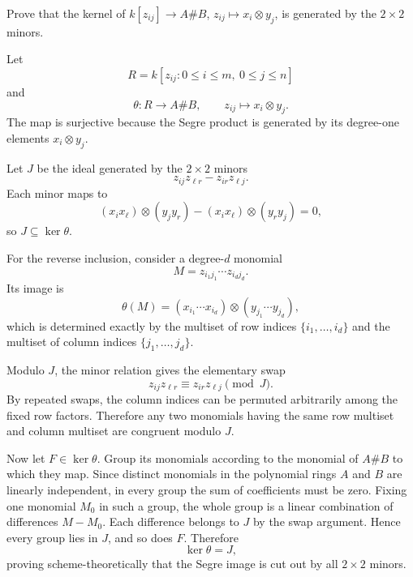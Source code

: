 \begin{problem}\label{prob:vi38-09}
Prove that the kernel of \(k[z_{ij}]\to A\#B\), \(z_{ij}\mapsto x_i\otimes y_j\), is generated by the \(2\times2\) minors.
\end{problem}

\ifdefined\FullProblemDossiers
\begin{solution}
Let
\[
R=k[z_{ij}:0\le i\le m,\ 0\le j\le n]
\]
and
\[
\theta:R\longrightarrow A\#B,
\qquad z_{ij}\longmapsto x_i\otimes y_j.
\]
The map is surjective because the Segre product is generated by its degree-one
elements \(x_i\otimes y_j\).

Let \(J\) be the ideal generated by the \(2\times2\) minors
\[
z_{ij}z_{\ell r}-z_{ir}z_{\ell j}.
\]
Each minor maps to
\[
(x_ix_\ell)\otimes(y_jy_r)-(x_ix_\ell)\otimes(y_ry_j)=0,
\]
so \(J\subseteq\ker\theta\).

For the reverse inclusion, consider a degree-\(d\) monomial
\[
M=z_{i_1j_1}\cdots z_{i_dj_d}.
\]
Its image is
\[
\theta(M)
=(x_{i_1}\cdots x_{i_d})\otimes(y_{j_1}\cdots y_{j_d}),
\]
which is determined exactly by the multiset of row indices
\(\{i_1,\ldots,i_d\}\) and the multiset of column indices
\(\{j_1,\ldots,j_d\}\).

Modulo \(J\), the minor relation gives the elementary swap
\[
z_{ij}z_{\ell r}\equiv z_{ir}z_{\ell j}\pmod J.
\]
By repeated swaps, the column indices can be permuted arbitrarily among the fixed
row factors. Therefore any two monomials having the same row multiset and column
multiset are congruent modulo \(J\).

Now let \(F\in\ker\theta\). Group its monomials according to the monomial of
\(A\#B\) to which they map. Since distinct monomials in the polynomial rings
\(A\) and \(B\) are linearly independent, in every group the sum of coefficients
must be zero. Fixing one monomial \(M_0\) in such a group, the whole group is a
linear combination of differences \(M-M_0\). Each difference belongs to \(J\) by
the swap argument. Hence every group lies in \(J\), and so does \(F\). Therefore
\[
\boxed{\ker\theta=J},
\]
proving scheme-theoretically that the Segre image is cut out by all
\(2\times2\) minors.
\end{solution}
\fi
